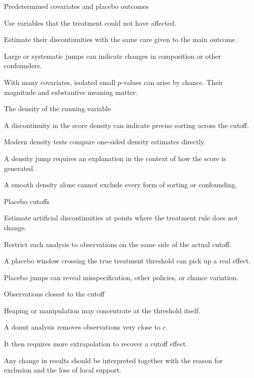 \begin{frame}{Predetermined covariates and placebo outcomes}
\begin{items}
\item Use variables that the treatment could not have affected.
\item Estimate their discontinuities with the same care given to the main outcome.
\item Large or systematic jumps can indicate changes in composition or other confounders.
\item With many covariates, isolated small $p$-values can arise by chance. Their magnitude and substantive meaning matter.
\end{items}
\end{frame}

\begin{frame}{The density of the running variable}
\begin{items}
\item A discontinuity in the score density can indicate precise sorting across the cutoff.
\item Modern density tests compare one-sided density estimates directly.
\item A density jump requires an explanation in the context of how the score is generated.
\item A smooth density alone cannot exclude every form of sorting or confounding.
\end{items}
\end{frame}

\begin{frame}{Placebo cutoffs}
\begin{items}
\item Estimate artificial discontinuities at points where the treatment rule does not change.
\item Restrict each analysis to observations on the same side of the actual cutoff.
\item A placebo window crossing the true treatment threshold can pick up a real effect.
\item Placebo jumps can reveal misspecification, other policies, or chance variation.
\end{items}
\end{frame}

\begin{frame}{Observations closest to the cutoff}
\begin{items}
\item Heaping or manipulation may concentrate at the threshold itself.
\item A donut analysis removes observations very close to $c$.
\item It then requires more extrapolation to recover a cutoff effect.
\item Any change in results should be interpreted together with the reason for exclusion and the loss of local support.
\end{items}
\end{frame}

